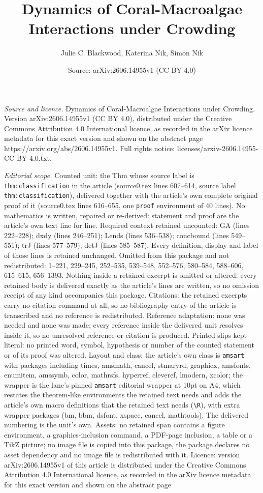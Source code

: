\documentclass[10pt,a4paper]{amsart}
\title[Dynamics of Coral-Macroalgae Interactions under Crowding]{Dynamics of Coral-Macroalgae Interactions under Crowding}
\author{Julie C. Blackwood, Katerina Nik, Simon Nik}
\date{Source: arXiv:2606.14955v1 (CC BY 4.0)}
\begin{document}
\maketitle

\noindent\emph{Source and licence.} Dynamics of Coral-Macroalgae Interactions under Crowding. Version arXiv:2606.14955v1 (CC BY 4.0), distributed under the Creative Commons Attribution 4.0 International licence, as recorded in the arXiv licence metadata for this exact version and shown on the abstract page https://arxiv.org/abs/2606.14955v1. Full rights notice: licenses/arxiv-2606.14955-CC-BY-4.0.txt.\par\smallskip

\noindent\textit{Editorial scope.} Counted unit: the Thm whose source label is \texttt{thm:classification} in the article (source0.tex lines 607--614, source label \texttt{thm:classification}), delivered together with the article's own complete original proof of it (source0.tex lines 616--655, one \texttt{proof} environment of 40 lines). No mathematics is written, repaired or re-derived: statement and proof are the article's own text line for line. Required context retained uncounted: GA (lines 222--228); dxdy (lines 246--251); Lends (lines 536--538); concbound (lines 549--551); trJ (lines 577--579); detJ (lines 585--587). Every definition, display and label of those lines is retained unchanged. Omitted from this package and not redistributed: 1--221, 229--245, 252--535, 539--548, 552--576, 580--584, 588--606, 615--615, 656--1393. Nothing inside a retained excerpt is omitted or altered: every retained body is delivered exactly as the article's lines are written, so no omission receipt of any kind accompanies this package. Citations: the retained excerpts carry no citation command at all, so no bibliography entry of the article is transcribed and no reference is redistributed. Reference adaptation: none was needed and none was made; every reference inside the delivered unit resolves inside it, so no unresolved reference or citation is produced. Printed slips kept literal: no printed word, symbol, hypothesis or number of the counted statement or of its proof was altered. Layout and class: the article's own class is \texttt{amsart} with packages including times, amsmath, cancel, stmaryrd, graphicx, amsfonts, enumitem, amssymb, color, mathrsfs, hyperref, cleveref, lmodern, xcolor; the wrapper is the lane's pinned \texttt{amsart} editorial wrapper at 10pt on A4, which restates the theorem-like environments the retained text needs and adds the article's own macro definitions that the retained text needs (\texttt{\textbackslash R}), with extra wrapper packages (bm, bbm, dsfont, xspace, cancel, mathtools). The delivered numbering is the unit's own. Assets: no retained span contains a figure environment, a graphics-inclusion command, a PDF-page inclusion, a table or a TikZ picture; no image file is copied into this package, the package declares no asset dependency and no image file is redistributed with it. Licence: version arXiv:2606.14955v1 of this article is distributed under the Creative Commons Attribution 4.0 International licence, as recorded in the arXiv licence metadata for this exact version and shown on the abstract page 
\end{document}
